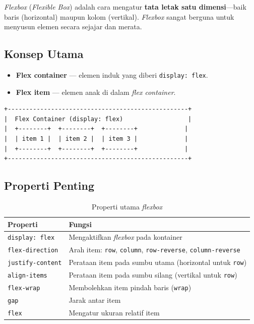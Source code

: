 \emph{Flexbox} (\emph{Flexible Box}) adalah cara mengatur \textbf{tata letak satu dimensi}---baik baris (horizontal) maupun kolom (vertikal). \emph{Flexbox} sangat berguna untuk menyusun elemen secara sejajar dan merata.

\subsection{Konsep Utama}
\label{subsec:konsep-flexbox}

\begin{itemize}
  \item \textbf{Flex container} --- elemen induk yang diberi \texttt{display: flex}.
  \item \textbf{Flex item} --- elemen anak di dalam \emph{flex container}.
\end{itemize}

\begin{lstlisting}[caption={Ilustrasi flex container dan flex items}, label={lst:flexbox-illust}]
+--------------------------------------------------+
|  Flex Container (display: flex)                  |
|  +--------+  +--------+  +--------+             |
|  | item 1 |  | item 2 |  | item 3 |             |
|  +--------+  +--------+  +--------+             |
+--------------------------------------------------+
\end{lstlisting}

\subsection{Properti Penting}
\label{subsec:properti-flexbox}

\begin{table}[h!]
\centering
\caption{Properti utama \emph{flexbox}}
\label{tab:properti-flexbox}
\begin{tabular}{|l|p{9cm}|}
\hline
\textbf{Properti} & \textbf{Fungsi} \\
\hline
\texttt{display: flex} & Mengaktifkan \emph{flexbox} pada kontainer \\
\hline
\texttt{flex-direction} & Arah item: \texttt{row}, \texttt{column}, \texttt{row-reverse}, \texttt{column-reverse} \\
\hline
\texttt{justify-content} & Perataan item pada sumbu utama (horizontal untuk \texttt{row}) \\
\hline
\texttt{align-items} & Perataan item pada sumbu silang (vertikal untuk \texttt{row}) \\
\hline
\texttt{flex-wrap} & Membolehkan item pindah baris (\texttt{wrap}) \\
\hline
\texttt{gap} & Jarak antar item \\
\hline
\texttt{flex} & Mengatur ukuran relatif item \\
\hline
\end{tabular}
\end{table}


